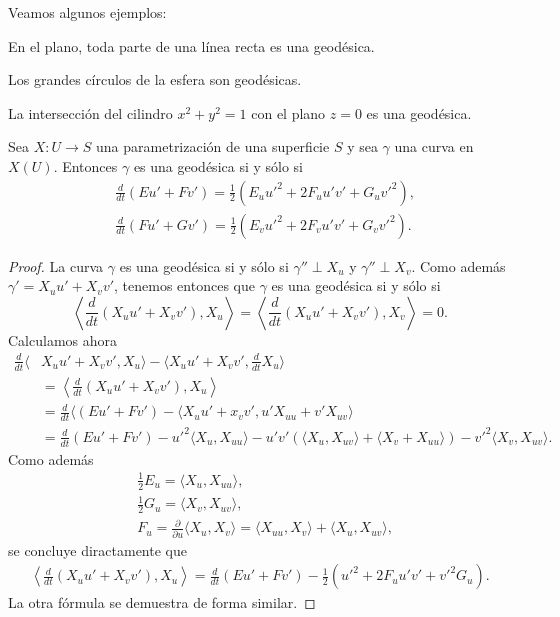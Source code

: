 Veamos algunos ejemplos:

\begin{example}
	En el plano, toda parte de una línea recta es una geodésica. 
\end{example}

\begin{example}
	Los grandes círculos de la esfera son geodésicas.
\end{example}

\begin{example}
	La intersección del cilindro $x^2+y^2=1$ con el plano $z=0$ es una geodésica.
\end{example}

\begin{theorem}
	\label{thm:geodesicas}
	Sea $X\colon U\to S$ una parametrización de una superficie $S$ y sea
	$\gamma$ una curva en $X(U)$. Entonces $\gamma$ es una geodésica si y sólo
	si 
	\begin{align*}
			&\frac{d}{dt}(Eu'+Fv')=\frac12(E_uu'^2+2F_uu'v'+G_uv'^2),\\
			&\frac{d}{dt}(Fu'+Gv')=\frac12(E_vu'^2+2F_vu'v'+G_vv'^2).
	\end{align*}
\end{theorem}

\begin{proof}
	La curva $\gamma$ es una geodésica si y sólo si $\gamma''\perp X_u$ y $\gamma''\perp X_v$. Como además 
	$\gamma'=X_uu'+X_vv'$, tenemos entonces que $\gamma$ es una geodésica si y sólo si 
	\[
		\left\langle\frac{d}{dt}(X_uu'+X_vv'),X_u\right\rangle=\left\langle\frac{d}{dt}(X_uu'+X_vv'),X_v\right\rangle=0.
	\]
	Calculamos ahora
	\begin{align*}
		\frac{d}{dt}\langle& X_uu'+X_vv',X_u\rangle-\langle X_uu'+X_vv',\frac{d}{dt}X_u\rangle\\
		&=\left\langle\frac{d}{dt}(X_uu'+X_vv'),X_u\right\rangle\\
		&=\frac{d}{dt}\langle (Eu'+Fv')-\langle X_uu'+x_vv',u'X_{uu}+v'X_{uv}\rangle\\
		&=\frac{d}{dt}(Eu'+Fv')-u'^2\langle X_u,X_{uu}\rangle-u'v'(\langle X_u,X_{uv}\rangle+\langle X_v+X_{uu}\rangle)-v'^2\langle X_v,X_{uv}\rangle.
	\end{align*}
	Como además
	\begin{align*}
		&\frac12 E_u=\langle X_u,X_{uu}\rangle,\\
		&\frac12 G_u=\langle X_v,X_{uv}\rangle,\\
		&F_u=\frac{\partial}{\partial u}\langle X_u,X_{v}\rangle=\langle X_{uu},X_v\rangle+\langle X_u,X_{uv}\rangle,
	\end{align*}
	se concluye diractamente que
	\begin{align*}
		\left\langle\frac{d}{dt}(X_uu'+X_vv'),X_u\right\rangle
		=\frac{d}{dt}(Eu'+Fv')-\frac12(u'^2+2F_uu'v'+v'^2G_u).
	\end{align*}
	La otra fórmula se demuestra de forma similar. 
\end{proof}


